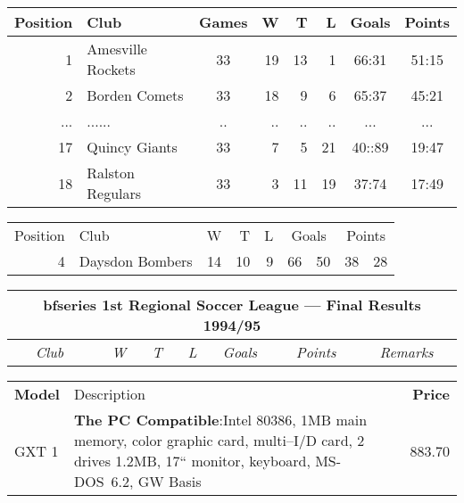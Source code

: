 \documentclass[12pt,twoside,a4paper]{article}   %
\begin{document}
	\begin{tabular}{|r|l||c|rrr|c|c|}\hline
	Position & Club & Games & W & T & L & Goals & Points\\[0.5ex]
	\hline\hline
	1 & Amesville Rockets & 33 & 19 & 13 & 1 & 66:31 & 51:15 \\
	\hline
	2 & Borden Comets     & 33 & 18 &  9 & 6 & 65:37 & 45:21 \\
	\hline
	... & ......          & .. & .. & .. & .. &...   & ...   \\
	\hline
	17 & Quincy Giants    & 33 & 7  & 5  & 21 & 40::89 & 19:47 \\
	\hline
	18 & Ralston Regulars & 33 & 3  & 11 & 19 & 37:74 & 17:49 \\
	\hline
	\end{tabular}
	\begin{tabular}{|r|l||@{ 33 }|rrr|r@{:}l|r@{:}l|}\hline
	Position & Club & W & T & L & \multicolumn{2}{c}{Goals} & \multicolumn{2}{c}{Points}\\[0.5ex]
	4 & Daysdon Bombers     & 14 & 10 &  9 & 66 & 50 & 38 & 28 \\
	\hline
	\end{tabular}
	\begin{tabular}{|r|l||rrr|r@{:}l|r@{:}l|||c|}\hline
	\multicolumn{10}{|c|}{\rule[-3mm]{0mm}{8mm}bfseries 1st Regional Soccer League --- Final Results 1994/95} \\ \hline
	& \itshape Club & \itshape W & \itshape T & \itshape L & \multicolumn{2}{c}{\itshape Goals} & \multicolumn{2}{c}{\itshape Points} & \itshape Remarks \\ \hline\hline
	\end{tabular}
	\begin{tabular}{lp{8.0cm}r}
	\bfseries Model & Description & \bfseries Price \\[1ex]
	GXT 1 & \small{\bfseries The PC Compatible}:Intel 80386, 1MB main memory, color graphic card, multi--I/D card, 2 drives 1.2MB, 17`` monitor, keyboard, MS-DOS~6.2, GW Basis & 883.70\\
	\end{tabular}
	\newsavebox{\kk}\newsavebox{\kkk}
	\sbox{\kk}{\framebox[4mm]{\rule{0mm}{3mm}}}
	\sbox{\kkk}{\usebox{\kk}\usebox{\kk}\usebox{\kk}}
\end{document}
